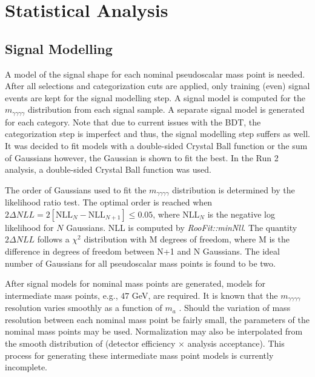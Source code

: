 \documentclass[12pt]{article}
\begin{document}
\section{Statistical Analysis}
\subsection{Signal Modelling} \label{sec:sig-mod}
A model of the signal shape for each nominal pseudoscalar mass point is needed. After all selections and categorization cuts are applied, only training (even) signal events are kept for the signal modelling step. A signal model is computed for the $m_{\gamma \gamma \gamma \gamma}$ distribution from each signal sample. A separate signal model is generated for each category. Note that due to current issues with the BDT, the categorization step is imperfect and thus, the signal modelling step suffers as well. It was decided to fit models with a double-sided Crystal Ball function or the sum of Gaussians however, the Gaussian is shown to fit the best. In the Run 2 analysis, a double-sided Crystal Ball function was used.\par

The order of Gaussians used to fit the $m_{\gamma \gamma \gamma \gamma}$ distribution is determined by the likelihood ratio test. The optimal order is reached when $2\Delta NLL = 2[\text{NLL}_{N} - \text{NLL}_{N+1}] \leq 0.05$, where $\text{NLL}_{N}$ is the negative log likelihood for $N$ Gaussians. NLL is computed by \textit{RooFit::minNll}. The quantity $2\Delta NLL$ follows a $\chi^2$ distribution with M degrees of freedom, where M is the difference in degrees of freedom between N+1 and N Gaussians. The ideal number of Gaussians for all pseudoscalar mass points is found to be two.\par

After signal models for nominal mass points are generated, models for intermediate mass points, e.g., $47$ GeV, are required. It is known that the $m_{\gamma\gamma\gamma\gamma}$ resolution varies smoothly as a function of $m_{a}$ \cite{Run2_analysis}. Should the variation of mass resolution between each nominal mass point be fairly small, the parameters of the nominal mass points may be used. Normalization may also be interpolated from the smooth distribution of (detector efficiency $\times$ analysis acceptance). This process for generating these intermediate mass point models is currently incomplete.\par
\end{document}
